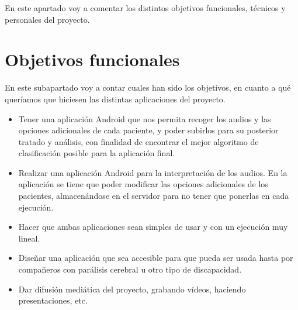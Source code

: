 
En este apartado voy a comentar los distintos objetivos funcionales, técnicos y personales del proyecto.

\section{Objetivos funcionales}
En este subapartado voy a contar cuales han sido los objetivos, en cuanto a qué queríamos que hiciesen las distintas aplicaciones del proyecto.
\begin{itemize}
	\item
	Tener una aplicación Android que nos permita recoger los audios y las opciones adicionales de cada paciente, y poder subirlos para su posterior tratado y análisis, con finalidad de encontrar el mejor algoritmo de clasificación posible para la aplicación final.
	\item
	Realizar una aplicación Android para la interpretación de los audios. En la aplicación se tiene que poder modificar las opciones adicionales de los pacientes, almacenándose en el servidor para no tener que ponerlas en cada ejecución.
	\item
	Hacer que ambas aplicaciones sean simples de usar y con un ejecución muy lineal.
	\item
	Diseñar una aplicación que sea accesible para que pueda ser usada hasta por compañeros con parálisis cerebral u otro tipo de discapacidad.
	\item
	Dar difusión mediática del proyecto, grabando vídeos, haciendo presentaciones, etc.
\end{itemize}

